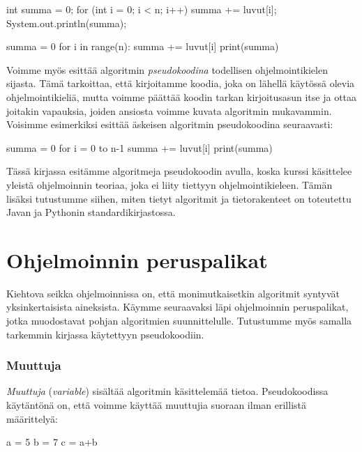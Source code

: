 \begin{code}
int summa = 0;
for (int i = 0; i < n; i++) {
    summa += luvut[i];
}
System.out.println(summa);
\end{code}

\begin{code}
summa = 0
for i in range(n):
    summa += luvut[i]
print(summa)
\end{code}


Voimme myös esittää algoritmin \emph{pseudokoodina}
todellisen ohjelmointikielen sijasta.
Tämä tarkoittaa, että kirjoitamme koodia,
joka on lähellä käytössä olevia ohjelmointikieliä, mutta voimme
päättää koodin tarkan kirjoitusasun itse ja ottaa joitakin vapauksia,
joiden ansiosta voimme kuvata algoritmin mukavammin.
Voisimme esimerkiksi esittää äskeisen algoritmin pseudokoodina seuraavasti:

\begin{code}
summa = 0
for i = 0 to n-1
    summa += luvut[i]
print(summa)
\end{code}

Tässä kirjassa esitämme algoritmeja pseudokoodin avulla,
koska kurssi käsittelee yleistä ohjelmoinnin teoriaa,
joka ei liity tiettyyn ohjelmointikieleen.
Tämän lisäksi tutustumme siihen, miten tietyt algoritmit
ja tietorakenteet on toteutettu Javan ja Pythonin
standardikirjastossa.

\section{Ohjelmoinnin peruspalikat}

Kiehtova seikka ohjelmoinnissa on, että monimutkaisetkin algoritmit
syntyvät yksinkertaisista aineksista.
Käymme seuraavaksi läpi ohjelmoinnin peruspalikat,
jotka muodostavat pohjan algoritmien suunnittelulle.
Tutustumme myös samalla tarkemmin kirjassa käytettyyn pseudokoodiin.

\subsubsection{Muuttuja}

\emph{Muuttuja} (\emph{variable}) sisältää algoritmin
käsittelemää tietoa.
Pseudokoodissa käytäntönä on, että voimme käyttää muuttujia
suoraan ilman erillistä määrittelyä:

\begin{code}
a = 5
b = 7
c = a+b
\end{code}

